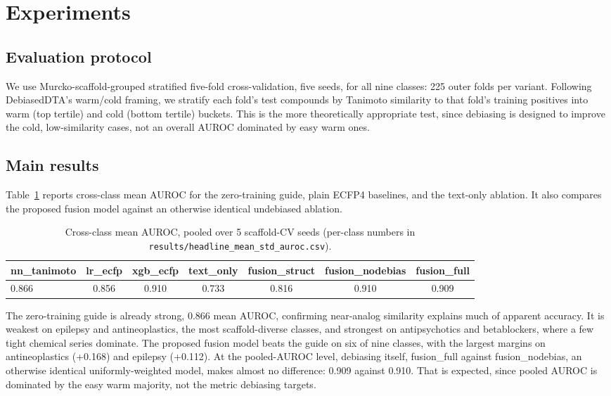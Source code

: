 \documentclass{llncs}
\begin{document}
\section{Experiments}
\label{sec:experiments}
\subsection{Evaluation protocol}
\label{sec:intro}
We use Murcko-scaffold-grouped stratified five-fold cross-validation, five seeds, for all nine classes: 225 outer folds per variant. Following DebiasedDTA's warm/cold framing, we stratify each fold's test compounds by Tanimoto similarity to that fold's training positives into warm (top tertile) and cold (bottom tertile) buckets. This is the more theoretically appropriate test, since debiasing is designed to improve the cold, low-similarity cases, not an overall AUROC dominated by easy warm ones.

\subsection{Main results}
Table~\ref{tab:headline} reports cross-class mean AUROC for the zero-training guide, plain ECFP4 baselines, and the text-only ablation. It also compares the proposed fusion model against an otherwise identical undebiased ablation.

\begin{table}[t]
\centering
\small
\caption{Cross-class mean AUROC, pooled over 5 scaffold-CV seeds (per-class numbers in \texttt{results/headline\_mean\_std\_auroc.csv}).}
\label{tab:headline}
\begin{tabular}{lcccccc}
\toprule
nn\_tanimoto & lr\_ecfp & xgb\_ecfp & text\_only & fusion\_struct & fusion\_nodebias & fusion\_full \\
\midrule
0.866 & 0.856 & 0.910 & 0.733 & 0.816 & 0.910 & 0.909 \\
\bottomrule
\end{tabular}
\end{table}

The zero-training guide is already strong, 0.866 mean AUROC, confirming near-analog similarity explains much of apparent accuracy. It is weakest on epilepsy and antineoplastics, the most scaffold-diverse classes, and strongest on antipsychotics and betablockers, where a few tight chemical series dominate. The proposed fusion model beats the guide on six of nine classes, with the largest margins on antineoplastics (+0.168) and epilepsy (+0.112). At the pooled-AUROC level, debiasing itself, fusion\_full against fusion\_nodebias, an otherwise identical uniformly-weighted model, makes almost no difference: 0.909 against 0.910. That is expected, since pooled AUROC is dominated by the easy warm majority, not the metric debiasing targets.
\end{document}
